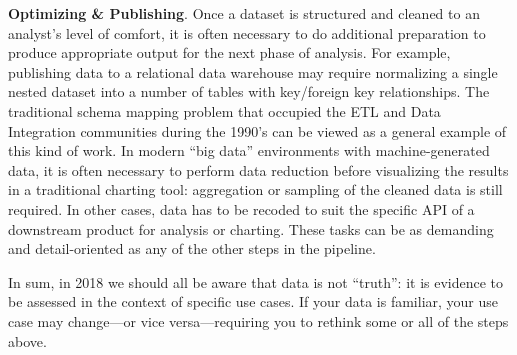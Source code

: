 \documentclass[11pt]{article}
\newcommand{\smallitem}[1]{\vspace{0.3em}\noindent\textbf{#1}}
\newcommand{\smallitembot}{\vspace{0.5em}\noindent}
\begin{document}
\smallitem{Optimizing \& Publishing}. Once a dataset is structured and cleaned to an analyst's level of comfort, it is often necessary to do additional preparation to produce appropriate output for the next phase of analysis. For example, publishing data to a relational data warehouse may require normalizing a single nested dataset into a number of tables with key/foreign key relationships. The traditional schema mapping problem that occupied the ETL and Data Integration communities during the 1990's can be viewed as a general example of this kind of work. In modern ``big data'' environments with machine-generated data, it is often necessary to perform data reduction before visualizing the results in a traditional charting tool: aggregation or sampling of the cleaned data is still required. In other cases, data has to be recoded to suit the specific API of a downstream product for analysis or charting. These tasks can be as demanding and detail-oriented as any of the other steps in the pipeline. 
\smallitembot{}

In sum, in 2018 we should all be aware that data is not ``truth'': it is evidence to be assessed in the context of specific use cases. If your data is familiar, your use case may change---or vice versa---requiring you to rethink some or all of the steps above. 

\end{document}
